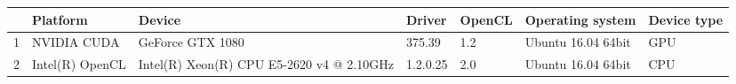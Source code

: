 \begin{tabular}{lllllll}
\toprule
{} &         Platform &                                     Device &    Driver & OpenCL &    Operating system & Device type \\
\midrule
1 &      NVIDIA CUDA &                           GeForce GTX 1080 &    375.39 &    1.2 &  Ubuntu 16.04 64bit &         GPU \\
2 &  Intel(R) OpenCL &  Intel(R) Xeon(R) CPU E5-2620 v4 @ 2.10GHz &  1.2.0.25 &    2.0 &  Ubuntu 16.04 64bit &         CPU \\
\bottomrule
\end{tabular}
